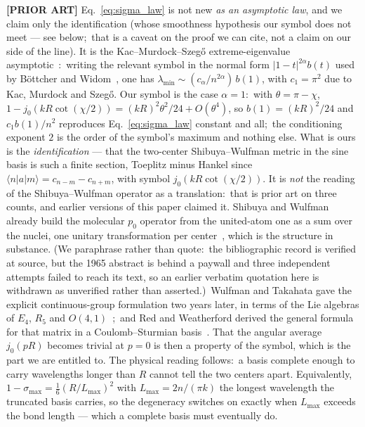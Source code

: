 \documentclass[aps,pra,twocolumn,superscriptaddress,longbibliography]{revtex4-2}
\begin{document}
\textbf{[PRIOR ART]} Eq.~\eqref{eq:sigma_law} is not new \emph{as an
asymptotic law}, and we claim only the identification (whose smoothness
hypothesis our symbol does not meet --- see below;\ that is a caveat on the
proof we can cite, not a claim on our side of the line).  It is the
Kac--Murdock--Szeg\H{o} extreme-eigenvalue
asymptotic~\cite{kac_murdock_szego1953}:\ writing the relevant symbol in the
normal form $|1-t|^{2\alpha}b(t)$ used by B\"ottcher and
Widom~\cite{bottcher_widom2005}, one has
$\lambda_{\min}\sim(c_\alpha/n^{2\alpha})\,b(1)$, with $c_1=\pi^2$ due to Kac,
Murdock and Szeg\H{o}.  Our symbol is the case $\alpha=1$:\ with
$\theta=\pi-\chi$, $1-j_0(kR\cot(\chi/2))=(kR)^2\theta^2/24+O(\theta^4)$, so
$b(1)=(kR)^2/24$ and $c_1b(1)/n^2$ reproduces Eq.~\eqref{eq:sigma_law}
constant and all;\ the conditioning exponent $2$ is the order of the symbol's
maximum and nothing else.  What is ours is the \emph{identification} --- that
the two-center Shibuya--Wulfman metric in the sine basis is such a finite
section, Toeplitz minus Hankel since $\langle n|a|m\rangle=c_{n-m}-c_{n+m}$,
with symbol $j_0(kR\cot(\chi/2))$.  It is \emph{not} the reading of the
Shibuya--Wulfman operator as a translation:\ that is prior art on three
counts, and earlier versions of this paper claimed it.  Shibuya and Wulfman already
build the molecular $p_0$ operator from the united-atom one as a sum over the
nuclei, one unitary transformation per center~\cite{shibuya1965}, which is the
structure in substance.  (We paraphrase rather than quote:\ the bibliographic
record is verified at source, but the 1965 abstract is behind a paywall and
three independent attempts failed to reach its text, so an earlier verbatim
quotation here is withdrawn as unverified rather than asserted.)\ Wulfman and Takahata gave the explicit
continuous-group formulation two years later, in terms of the Lie algebras of
$E_4$, $R_5$ and $O(4,1)$~\cite{wulfman_takahata1967};\ and Red and
Weatherford derived the general formula for that matrix in a Coulomb--Sturmian
basis~\cite{red_weatherford2004}.  That the
angular average $j_0(pR)$ becomes trivial at $p=0$ is then a property of the
symbol, which is the part we are entitled to.  The physical reading follows:\ a basis
complete enough to carry wavelengths longer than $R$ cannot tell the two
centers apart.  Equivalently, $1-\sigma_{\max}=\tfrac16(R/L_{\max})^2$ with
$L_{\max}=2n/(\pi k)$ the longest wavelength the truncated basis carries, so
the degeneracy switches on exactly when $L_{\max}$ exceeds the bond length ---
which a complete basis must eventually do.
\end{document}
